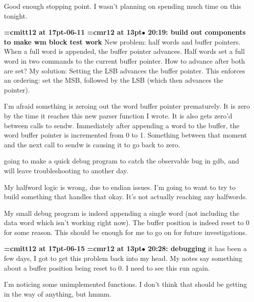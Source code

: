 Good enough stopping point. I wasn't planning on spending much time on this tonight.
\par

{\medskip\noindent\bf\font\titlefont=cmitt12 at 17pt-06-11}\medskip
{\smallskip\noindent\bf\font\titlefont=cmr12 at 13pt\titlefont $\bullet$ 20:19: build out components to make wm block test work}\smallskip
New problem: half words and buffer pointers. When a full word is appended, the buffer pointer advances. Half words set a full word in two commands to the current buffer pointer. How to advance after both are set? My solution: Setting the LSB advances the buffer pointer. This enforces an ordering: set the MSB, followed by the LSB (which then advances the pointer).
\par

I'm afraid something is zeroing out the word buffer pointer prematurely. It is zero by the time it reaches this new parser function I wrote. It is also gets zero'd between calls to sendw. Immediately after appending a word to the buffer, the word buffer pointer is incremented from 0 to 1. Something between that moment and the next call to sendw is causing it to go back to zero.
\par

going to make a quick debug program to catch the observable bug in gdb, and will leave troubleshooting to another day.
\par

My halfword logic is wrong, due to endian issues. I'm going to want to try to build something that handles that okay. It's not actually reaching any halfwords.
\par

My small debug program is indeed appending a single word (not including the data word which isn't working right now). The buffer position is indeed reset to 0 for some reason. This should be enough for me to go on for future investigations.
\par

{\medskip\noindent\bf\font\titlefont=cmitt12 at 17pt-06-15}\medskip
{\smallskip\noindent\bf\font\titlefont=cmr12 at 13pt\titlefont $\bullet$ 20:28: debugging}\smallskip
it has been a few days, I got to get this problem back into my head. My notes say something about a buffer position being reset to 0. I need to see this run again.
\par

I'm noticing some unimplemented functions. I don't think that should be getting in the way of anything, but hmmm.
\par

